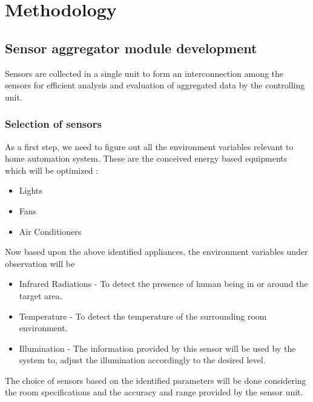 \documentclass[12pt,a4paper,titlepage,twoside]{article}
\begin{document}
        \section{Methodology}
        \subsection{Sensor aggregator module development}
        Sensors are collected in a single unit to form an interconnection among the sensors for efficient analysis and evaluation of aggregated data by the controlling unit.
        
        \subsubsection{Selection of sensors}
        As a first step, we need to figure out all the environment variables relevant to home automation system. These are the conceived energy based equipments which will be optimized :
        \begin{itemize}
            \item Lights
            \item Fans
            \item Air Conditioners
        \end{itemize}
        Now based upon the above identified appliances, the environment variables under observation will be
        \begin{itemize}
            \item Infrared Radiations - To detect the presence of human being in or around the target area.
            \item Temperature - To detect the temperature of the surrounding room environment.
            \item Illumination - The information provided by this sensor will be used by the system to, adjust the illumination accordingly to the desired level.
        \end{itemize}
        The choice of sensors based on the identified parameters will be done considering the room specifications and the accuracy and range provided by the sensor unit.
        
\end{document}
